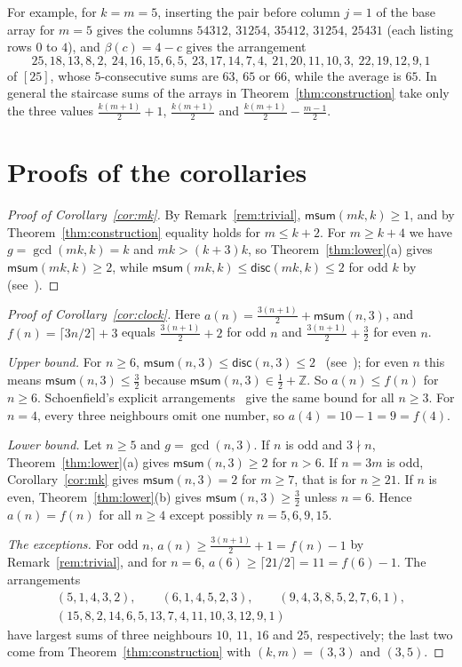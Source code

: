 \documentclass[11pt]{amsart}
\theoremstyle{remark}
\newcommand{\msum}{\mathsf{msum}}
\newcommand{\disc}{\mathsf{disc}}
\newcommand{\Z}{\mathbb{Z}}
\begin{document}
For example, for $k=m=5$, inserting the pair before column $j=1$ of the base array for $m=5$ gives the columns
$54312$, $31254$, $35412$, $31254$, $25431$ (each listing rows $0$ to $4$), and $\beta(c)=4-c$ gives the
arrangement
\[
  25,18,13,8,2,\ 24,16,15,6,5,\ 23,17,14,7,4,\ 21,20,11,10,3,\ 22,19,12,9,1
\]
of $[25]$, whose $5$-consecutive sums are $63$, $65$ or $66$, while the average is $65$. In general the staircase
sums of the arrays in Theorem~\ref{thm:construction} take only the three values $\frac{k(m+1)}2+1$,
$\frac{k(m+1)}2$ and $\frac{k(m+1)}2-\frac{m-1}2$.

\section{Proofs of the corollaries}

\begin{proof}[Proof of Corollary~\ref{cor:mk}]
By Remark~\ref{rem:trivial}, $\msum(mk,k)\ge1$, and by Theorem~\ref{thm:construction} equality holds for
$m\le k+2$. For $m\ge k+4$ we have $g=\gcd(mk,k)=k$ and $mk>(k+3)k$, so Theorem~\ref{thm:lower}(a) gives
$\msum(mk,k)\ge2$, while $\msum(mk,k)\le\disc(mk,k)\le2$ for odd $k$ by~\cite{AFG} (see~\cite[Theorem~2.4(iv)]{HK}).
\end{proof}

\begin{proof}[Proof of Corollary~\ref{cor:clock}]
Here $a(n)=\frac{3(n+1)}2+\msum(n,3)$, and $f(n)=\lceil 3n/2\rceil+3$ equals $\frac{3(n+1)}2+2$ for odd $n$ and
$\frac{3(n+1)}2+\frac32$ for even $n$.

\emph{Upper bound.} For $n\ge6$, $\msum(n,3)\le\disc(n,3)\le2$~\cite{AFG} (see~\cite[Theorem~2.4(iii)]{HK}); for even $n$ this means
$\msum(n,3)\le\frac32$ because $\msum(n,3)\in\frac12+\Z$. So $a(n)\le f(n)$ for $n\ge6$. Schoenfield's explicit
arrangements~\cite{OEIS} give the same bound for all $n\ge3$. For $n=4$, every three neighbours omit one number, so
$a(4)=10-1=9=f(4)$.

\emph{Lower bound.} Let $n\ge5$ and $g=\gcd(n,3)$. If $n$ is odd and $3\nmid n$, Theorem~\ref{thm:lower}(a) gives
$\msum(n,3)\ge2$ for $n>6$. If $n=3m$ is odd, Corollary~\ref{cor:mk} gives $\msum(n,3)=2$ for $m\ge7$, that is for
$n\ge21$. If $n$ is even, Theorem~\ref{thm:lower}(b) gives $\msum(n,3)\ge\frac32$ unless $n=6$. Hence $a(n)=f(n)$ for all $n\ge4$ except possibly $n=5,6,9,15$.

\emph{The exceptions.} For odd $n$, $a(n)\ge\frac{3(n+1)}2+1=f(n)-1$ by Remark~\ref{rem:trivial}, and for $n=6$,
$a(6)\ge\lceil 21/2\rceil=11=f(6)-1$. The arrangements
\begin{gather*}
  (5,1,4,3,2),\qquad (6,1,4,5,2,3),\qquad (9,4,3,8,5,2,7,6,1),\\ (15,8,2,14,6,5,13,7,4,11,10,3,12,9,1)
\end{gather*}
have largest sums of three neighbours $10$, $11$, $16$ and $25$, respectively; the last two come from
Theorem~\ref{thm:construction} with $(k,m)=(3,3)$ and $(3,5)$.
\end{proof}
\end{document}
